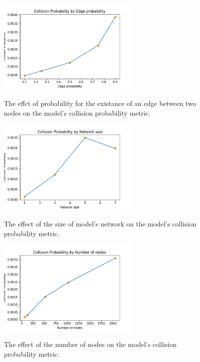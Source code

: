 \documentclass{article}
\begin{document}
\begin{figure}
    \begin{center}
        \includegraphics[width=7cm]{../figures/Collision_Probability_edge_prob.png}\\
        \caption{The effct of probability for the existance of an edge between two nodes on the model's collision probability metric.}
    \end{center}
\end{figure}    
\begin{figure}
    \begin{center}
        \includegraphics[width=7cm]{../figures/Collision_Probability_network_size.png}\\
        \caption{The effect of the size of model's network on the model's collision probability metric.}
    \end{center}
\end{figure}    
\begin{figure}
    \begin{center}
        \includegraphics[width=7cm]{../figures/Collision_Probability_num_nodes.png}\\
        \caption{The effect of the number of nodes on the model's collision probability metric.}
    \end{center}
\end{figure}    
\end{document}
